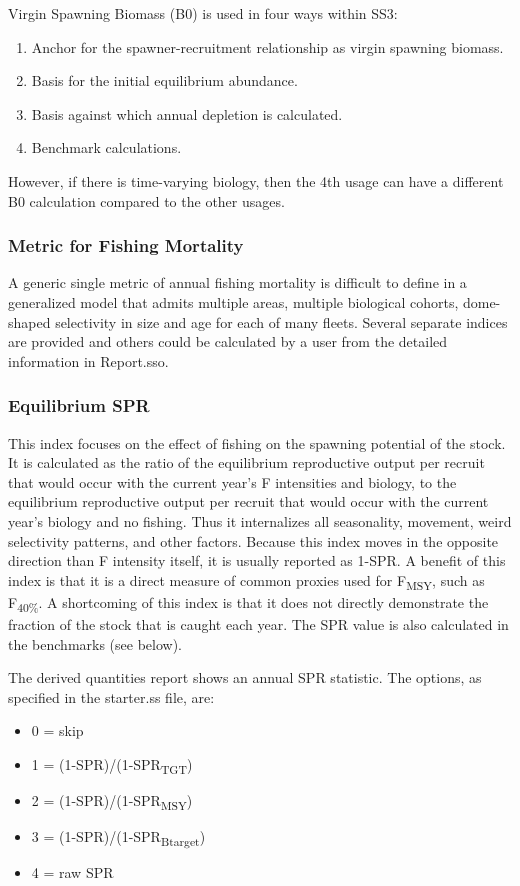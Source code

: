 Virgin Spawning Biomass (B0) is used in four ways within SS3:
\begin{enumerate}
	\item Anchor for the spawner-recruitment relationship as virgin spawning biomass.
	\item Basis for the initial equilibrium abundance. 
	\item Basis against which annual depletion is calculated.
	\item Benchmark calculations.
\end{enumerate}
However, if there is time-varying biology, then the 4th usage can have a different B0 calculation compared to the other usages.

\subsubsection{Metric for Fishing Mortality}
A generic single metric of annual fishing mortality is difficult to define in a generalized model that admits multiple areas, multiple biological cohorts, dome-shaped selectivity in size and age for each of many fleets. Several separate indices are provided and others could be calculated by a user from the detailed information in Report.sso.

\subsubsection{Equilibrium SPR}
This index focuses on the effect of fishing on the spawning potential of the stock. It is calculated as the ratio of the equilibrium reproductive output per recruit that would occur with the current year's F intensities and biology, to the equilibrium reproductive output per recruit that would occur with the current year's biology and no fishing.  Thus it internalizes all seasonality, movement, weird selectivity patterns, and other factors. Because this index moves in the opposite direction than F intensity itself, it is usually reported as 1-SPR. A benefit of this index is that it is a direct measure of common proxies used for F\textsubscript{MSY}, such as F\textsubscript {40\%}. A shortcoming of this index is that it does not directly demonstrate the fraction of the stock that is caught each year. The SPR value is also calculated in the benchmarks (see below). 

The derived quantities report shows an annual SPR statistic.  The options, as specified in the starter.ss file, are:
\begin{itemize}
	\item 0 = skip
	\item 1 = (1-SPR)/(1-SPR\textsubscript{TGT})
	\item 2 = (1-SPR)/(1-SPR\textsubscript{MSY})
	\item 3 = (1-SPR)/(1-SPR\textsubscript{Btarget})
	\item 4 = raw SPR
\end{itemize}

